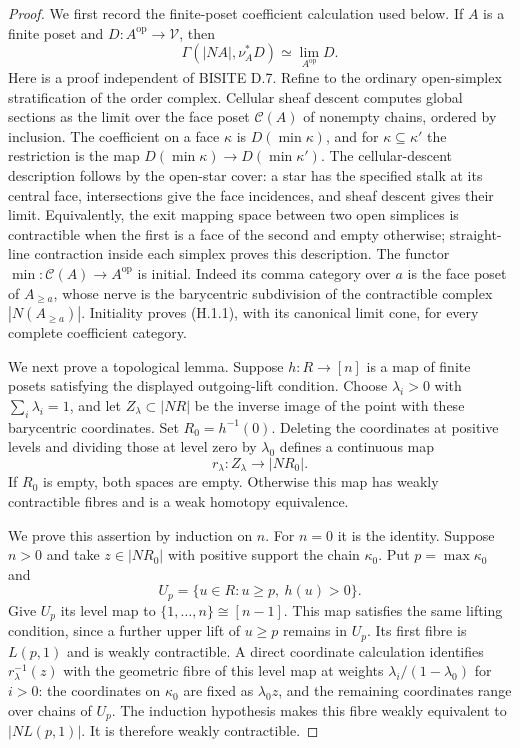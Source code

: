 \begin{proof}
We first record the finite-poset coefficient calculation used below.
If $A$ is a finite poset and $D:A^{\mathrm{op}}\to\mathcal V$,
then
\[
 \Gamma(|NA|,\nu_A^*D)\simeq\lim_{A^{\mathrm{op}}}D.
 \tag{H.1.1}
\]
Here is a proof independent of BISITE D.7. Refine to the ordinary
open-simplex stratification of the order complex. Cellular sheaf
descent computes global sections as the limit over the face poset
$\mathcal C(A)$ of nonempty chains, ordered by inclusion. The
coefficient on a face $\kappa$ is $D(\min\kappa)$, and for
$\kappa\subseteq\kappa'$ the restriction is the map
$D(\min\kappa)\to D(\min\kappa')$. The cellular-descent
description follows by the open-star cover: a star has the
specified stalk at its central face, intersections give the
face incidences, and sheaf descent gives their limit. Equivalently,
the exit mapping space between two open simplices is contractible
when the first is a face of the second and empty otherwise;
straight-line contraction inside each simplex proves this
description. The functor
$\min:\mathcal C(A)\to A^{\mathrm{op}}$ is initial. Indeed
its comma category over $a$ is the face poset of $A_{\geq a}$,
whose nerve is the barycentric subdivision of the contractible
complex $|N(A_{\geq a})|$. Initiality proves (H.1.1), with its
canonical limit cone, for every complete coefficient category.

We next prove a topological lemma. Suppose $h:R\to[n]$ is a map
of finite posets satisfying the displayed outgoing-lift condition.
Choose $\lambda_i>0$ with $\sum_i\lambda_i=1$, and let
$Z_\lambda\subset |NR|$ be the inverse image of the point with
these barycentric coordinates. Set $R_0=h^{-1}(0)$.
Deleting the coordinates at positive levels and dividing those at
level zero by $\lambda_0$ defines a continuous map
\[
 r_\lambda:Z_\lambda\longrightarrow |NR_0|.
\]
If $R_0$ is empty, both spaces are empty. Otherwise this map has
weakly contractible fibres and is a weak homotopy equivalence.

We prove this assertion by induction on $n$. For $n=0$ it is the
identity. Suppose $n>0$ and take $z\in|NR_0|$ with positive support
the chain $\kappa_0$. Put $p=\max\kappa_0$ and
\[
 U_p=\{u\in R:u\geq p,\ h(u)>0\}.
\]
Give $U_p$ its level map to $\{1,\ldots,n\}\cong[n-1]$.
This map satisfies the same lifting condition, since a further
upper lift of $u\geq p$ remains in $U_p$. Its first fibre is
$L(p,1)$ and is weakly contractible. A direct coordinate calculation
identifies $r_\lambda^{-1}(z)$ with the geometric fibre of this
level map at weights $\lambda_i/(1-\lambda_0)$ for $i>0$:
the coordinates on $\kappa_0$ are fixed as $\lambda_0z$, and the
remaining coordinates range over chains of $U_p$. The induction
hypothesis makes this fibre weakly equivalent to $|NL(p,1)|$.
It is therefore weakly contractible.


\end{proof}
